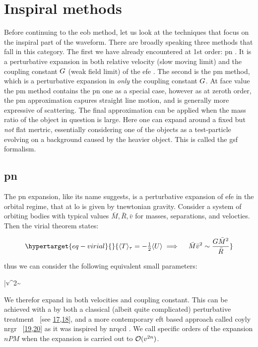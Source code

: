 \documentclass[
  10pt,
  a4paper,
  DIV=11,
  numbers=noendperiod,
  twoside]{scrreprt}
\let\[\relax \let\]\relax %
\DeclareRobustCommand{\[}{\begin{equation}}
\DeclareRobustCommand{\]}{\end{equation}}
\begin{document}
\hypertarget{inspiral-methods}{%
\section{Inspiral methods}\label{inspiral-methods}}

Before continuing to the \gls{eob} method, let us look at the techniques
that focus on the inspiral part of the waveform. There are broadly
speaking three methods that fall in this category. The first we have
already encountered at 1st order: \gls{pn} . It is a perturbative
expansion in both relative velocity (slow moving limit) and the coupling
constant \(\grav\) (weak field limit) of the \gls{efe} . The second is
the \gls{pm} method, which is a perturbative expansion in \emph{only}
the coupling constant \(\grav\). At face value the \gls{pm} method
contains the \gls{pn} one as a special case, however as at zeroth order,
the \gls{pm} approximation capures straight line motion, and is
generally more expressive of scattering. The final approximation can be
applied when the mass ratio of the object in question is large. Here one
can expand around a fixed but \emph{not} flat mertric, essentially
considering one of the objects as a test-particle evolving on a
background caused by the heavier object. This is called the \gls{gsf}
formalism.

\hypertarget{pn}{%
\subsection{\texorpdfstring{\gls{pn}}{}}\label{pn}}

The \gls{pn} expansion, like its name suggests, is a perturbative
expansion of \gls{efe} in the orbital regime, that at \gls{lo} is given
by tnewtonian gravity. Consider a system of orbiting bodies with typical
values \(\bar{M},\bar{R},\bar{v}\) for masses, separations, and
velocties. Then the virial theorem states:

\begin{equation}\protect\hypertarget{eq-virial}{}{
\ang{T}_\tau=-\half \ang{U} \implies \quad \bar{M} \bar{v}^2\sim \frac{G \bar{M}^2}{\bar{R}}
}\label{eq-virial}\end{equation}

thus we can consider the following equivalent small parameters:

\[
\bar{v}^2\sim {}
\]

We therefor expand in both velocities and coupling constant. This can be
achieved with a by both a classical (albeit quite complicated)
perturbative treatment ~{[}see
\protect\hyperlink{ref-Blanchet:2013haa}{17},\protect\hyperlink{ref-Blanchet:1995fg}{18}{]},
and a more contemporary \gls{eft} based approach called coyly \gls{nrgr}
~{[}\protect\hyperlink{ref-Goldberger:2004jt}{19},\protect\hyperlink{ref-Sturani:2021xpq}{20}{]}
as it was inspired by \gls{nrqcd} . We call specific orders of the
expansion \(nPM\) when the expansion is carried out to
\(\order[2n]{v}\).
\end{document}
